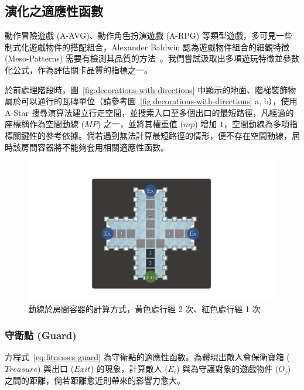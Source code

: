 \subsection{演化之適應性函數}
\label{ssec:method-segments-fitnesses}

動作冒險遊戲 (A-AVG)、動作角色扮演遊戲 (A-RPG) 等類型遊戲，多可見一些制式化遊戲物件的搭配組合，Alexander Baldwin 認為遊戲物件組合的細觀特徵 (Meso-Patterns) 需要有檢測其品質的方法~\cite{baldwin2017mixed}。我們嘗試汲取出多項遊玩特徵並參數化公式，作為評估關卡品質的指標之一。

於前處理階段時，圖~\ref{fig:decorations-with-directions} 中顯示的地面、階梯裝飾物屬於可以通行的瓦磚單位（請參考圖~\ref{fig:decorations-with-directions} a, b），使用 A-Star 搜尋演算法建立行走空間，並搜索入口至多個出口的最短路徑，凡經過的座標稱作為空間動線 ($MP$) 之一，並將其權重值 ($mp$) 增加 $1$，空間動線為多項指標關鍵性的參考依據。倘若遇到無法計算最短路徑的情形，便不存在空間動線，屆時該房間容器將不能夠套用相關適應性函數。

\begin{figure}[ht]
  \begin{center}
    \includegraphics[width=1.0\textwidth]{figures/fitnesses-mainpath.pdf}
    \caption{動線於房間容器的計算方式，黃色處行經 2 次、紅色處行經 1 次}
    \label{fig:fitnesses-mainpath}
  \end{center}
\end{figure}

\subsubsection{守衛點 (Guard)}
\label{sssec:method-segments-fitnesses-guard}

方程式~\ref{eq:fitnesses-guard} 為守衛點的適應性函數。為體現出敵人會保衛寶箱 ($Treasure$) 與出口 ($Exit$) 的現象，計算敵人 ($E_{i}$) 與為守護對象的遊戲物件 ($O_{j}$) 之間的距離，倘若距離愈近則帶來的影響力愈大。

